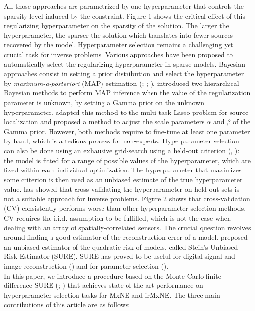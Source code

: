 All those approaches are parametrized by one hyperparameter that controls the sparsity level
induced by the constraint. Figure 1 shows the critical effect of this regularizing hyperparameter 
on the sparsity of the solution. The larger the hyperparameter, the sparser the solution which translates
into fewer sources recovered by the model. Hyperparameter selection remains a challenging yet crucial task
for inverse problems. Various approaches have been proposed to automatically select the regularizing 
hyperparameter in sparse models. Bayesian approaches consist in setting a prior distribution 
and select the hyperparameter by \textit{maximum-a-posteriori} (MAP) estimation (\cite{Pereyra_BioucasDias_Figueiredo_2015};
\cite{Vidal_Bortoli_Pereyra_Durmus_2020}; \cite{Hashemi_Cai_Kutyniok_Muller_2020}).
\cite{Pereyra_BioucasDias_Figueiredo_2015} introduced two hierarchical Bayesian methods to perform MAP 
inference when the value of the regularization parameter is unknown, by setting a Gamma prior on the 
unknown hyperparameter. \cite{Bekhti_Badeau_Gramfort_2017} adapted this method to the multi-task Lasso problem
for source localization and proposed a method to adjust the scale parameters $\alpha$ and $\beta$
of the Gamma prior. However, both methods require to fine-tune at least one parameter by hand, which is a
tedious process for non-experts. Hyperparameter selection can also be done using an exhausive
grid-search using a held-out criterion (\cite{Bergstra_Bengio12}, \cite{BergstraBardenetBengioKegl2011}): 
the model is fitted for a range of possible values of the hyperparameter, which are fixed within each individual optimization. 
The hyperparameter that maximizes some criterion is then used as an unbiased estimate of the true hyperparameter value.
\cite{Pedregosa16} has showed that cross-validating the hyperparameter on held-out sets is not a suitable approach for inverse 
problems. Figure 2 shows that cross-validation (CV) consistently performs worse than other 
hyperparameter selection methods. CV requires the i.i.d. assumption to be fulfilled, which is 
not the case when dealing with an array of spatially-correlated sensors. The crucial question revolves around
finding a good estimator of the reconstruction error of a model. \cite{Stein81} proposed an unbiased estimator
of the quadratic risk of models, called Stein's Unbiased Risk Estimator (SURE). SURE has proved to be 
useful for digital signal and image reconstruction (\cite{Pesquet_Benazza_Chaux_2009}) and for
parameter selection (\cite{Deledalle_Vaiter_Fadili_Peyre14}). 
\\
In this paper, we introduce a procedure based on the Monte-Carlo finite difference SURE 
(\cite{Deledalle_Vaiter_Fadili_Peyre14}; \cite{Ramani_Blu_Unser08}) that achieves state-of-the-art performance on hyperparameter 
selection tasks for MxNE and irMxNE. The three main contributions of this article are as follows:

